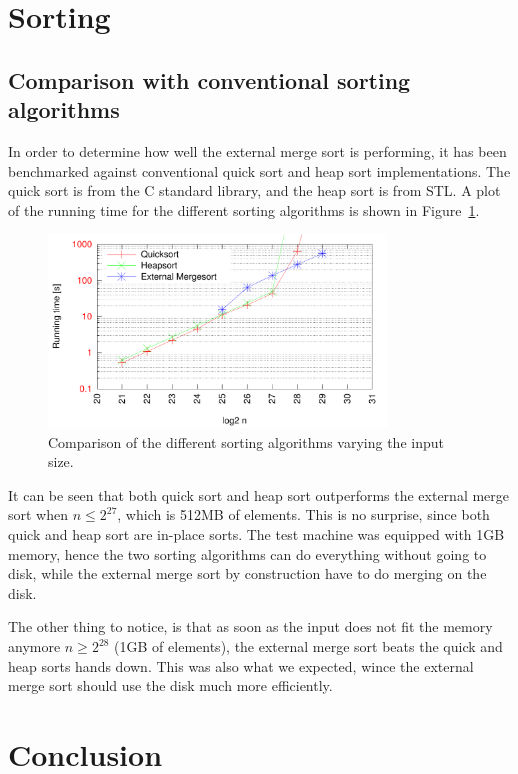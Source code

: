\documentclass[a4paper,12pt]{article}
\begin{document}
\section{Sorting}

\subsection{Comparison with conventional sorting algorithms}
In order to determine how well the external merge sort is performing,
it has been benchmarked against conventional quick sort and heap sort
implementations. The quick sort is from the C standard library, and
the heap sort is from STL. A plot of the running time for the
different sorting algorithms is shown in Figure~\ref{fig:best-sort}.

\begin{figure}[h!]
  \centering
  \includegraphics[width=0.8\textwidth]{best_sort}
  \caption{Comparison of the different sorting algorithms varying the input size.}
  \label{fig:best-sort}
\end{figure}

It can be seen that both quick sort and heap sort outperforms the
external merge sort when $n \leq 2^{27}$, which is 512MB of
elements. This is no surprise, since both quick and heap sort are
in-place sorts. The test machine was equipped with 1GB memory, hence
the two sorting algorithms can do everything without going to disk,
while the external merge sort by construction have to do merging on
the disk.

The other thing to notice, is that as soon as the input does not fit
the memory anymore $n \geq 2^{28}$ (1GB of elements), the external
merge sort beats the quick and heap sorts hands down. This was also
what we expected, wince the external merge sort should use the disk
much more efficiently.

\section{Conclusion}


\clearpage{}
\end{document}
